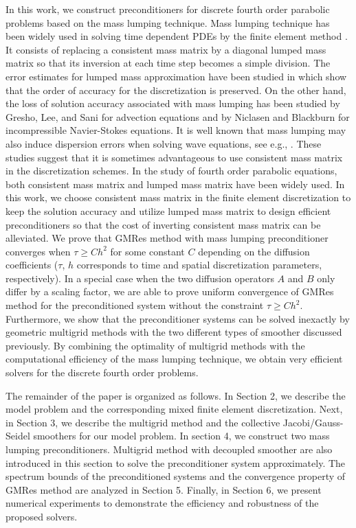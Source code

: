 \documentclass[smallcondensed]{svjour3}
\numberwithin{equation}{section} \numberwithin{table}{section}
\numberwithin{figure}{section}
\numberwithin{algorithm}{section}
\begin{document}
In this work, we construct preconditioners for discrete fourth order parabolic problems based on the mass lumping technique. Mass lumping technique has been widely used in solving time dependent PDEs by the finite element method \cite{HRZ_1976}. It consists of replacing a consistent mass matrix by a diagonal lumped mass matrix so that its inversion at each time step becomes a simple division. The error estimates for lumped mass approximation have been studied in \cite{Ushijima1977, ushijima1979error, chenthomee1985lumped} which show that the order of accuracy for the discretization is preserved. On the other hand, the loss of solution accuracy associated with mass lumping has been studied by Gresho, Lee, and Sani \cite{gresho1978advection} for advection equations and by Niclasen and Blackburn \cite{Niclasen1995} for incompressible Navier-Stokes equations. It is well known that mass lumping may also induce dispersion errors when solving wave equations, see e.g., \cite{mullen_belytschko_1982,mark_christon_1999}. These studies suggest that it is sometimes advantageous to use consistent mass matrix in the discretization schemes. In the study of fourth order parabolic equations, both consistent mass matrix and lumped mass matrix have been widely used. In this work, we choose consistent mass matrix in the finite element discretization to keep the solution accuracy and utilize lumped mass matrix to design efficient preconditioners so that the cost of inverting consistent mass matrix can be alleviated. We prove that GMRes method with mass lumping preconditioner converges when $\tau \geq Ch^2$ for some constant $C$ depending on the diffusion coefficients ($\tau$, $h$ corresponds to time and spatial discretization parameters, respectively). In a special case when the two diffusion operators $A$ and $B$ only differ by a scaling factor, we are able to prove uniform convergence of GMRes method for the preconditioned system without the constraint $\tau \geq Ch^2$. Furthermore, we show that the preconditioner systems can be solved inexactly by geometric multigrid methods with the two different types of smoother discussed previously. By combining the optimality of multigrid methods with the computational efficiency of the mass lumping technique, we obtain very efficient solvers for the discrete fourth order problems. 

The remainder of the paper is organized as follows. In Section 2, we describe the model problem and the corresponding mixed finite element discretization. Next, in Section 3, we describe the multigrid method and the collective Jacobi/Gauss-Seidel smoothers for our model problem. In section 4, we construct two mass lumping preconditioners. Multigrid method with decoupled smoother are also introduced in this section to solve the preconditioner system approximately. The spectrum bounds of the preconditioned systems and the convergence property of GMRes method are analyzed in Section 5.  Finally, in Section 6, we present numerical experiments to demonstrate the efficiency and robustness of the proposed solvers.
\end{document}
